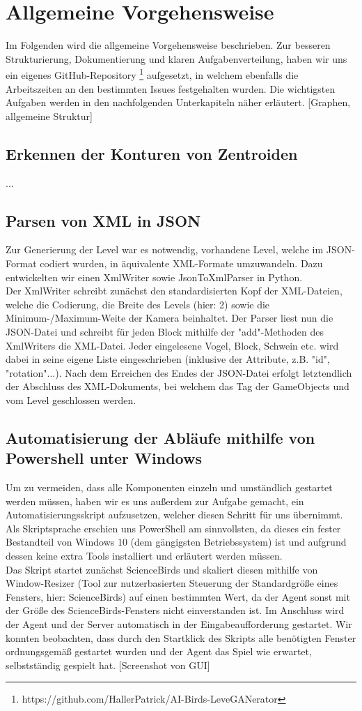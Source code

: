 \section{Allgemeine Vorgehensweise}
Im Folgenden wird die allgemeine Vorgehensweise beschrieben. Zur besseren Strukturierung, Dokumentierung und klaren Aufgabenverteilung, haben wir uns ein eigenes GitHub-Repository \footnote{https://github.com/HallerPatrick/AI-Birds-LeveGANerator} aufgesetzt, in welchem ebenfalls die Arbeitszeiten an den bestimmten Issues festgehalten wurden. Die wichtigsten Aufgaben werden in den nachfolgenden Unterkapiteln näher erläutert. [Graphen, allgemeine Struktur]
\subsection{Erkennen der  Konturen von Zentroiden}
...
\subsection{Parsen von XML in JSON}
Zur Generierung der Level war es notwendig, vorhandene Level, welche im JSON-Format codiert wurden, in äquivalente XML-Formate umzuwandeln. Dazu entwickelten wir einen XmlWriter sowie JsonToXmlParser in Python. \\ Der XmlWriter schreibt zunächst den standardisierten Kopf der XML-Dateien, welche die Codierung, die Breite des Levels (hier: 2) sowie die Minimum-/Maximum-Weite der Kamera beinhaltet. Der Parser liest nun die JSON-Datei und schreibt für jeden Block mithilfe der "add"-Methoden des XmlWriters die XML-Datei. Jeder eingelesene Vogel, Block, Schwein etc. wird dabei in seine eigene Liste eingeschrieben (inklusive der Attribute, z.B. "id", "rotation"...). Nach dem Erreichen des Endes der JSON-Datei erfolgt letztendlich der Abschluss des XML-Dokuments, bei welchem das Tag der GameObjects und vom Level geschlossen werden.
\subsection{Automatisierung der Abläufe mithilfe von Powershell unter Windows}
Um zu vermeiden, dass alle Komponenten einzeln und umständlich gestartet werden müssen, haben wir es uns außerdem zur Aufgabe gemacht, ein Automatisierungsskript aufzusetzen, welcher diesen Schritt für uns übernimmt. Als Skriptsprache erschien uns PowerShell am sinnvollsten, da dieses ein fester Bestandteil von Windows 10 (dem gängigsten Betriebssystem) ist und aufgrund dessen keine extra Tools installiert und erläutert werden müssen. \\Das Skript startet zunächst ScienceBirds und skaliert diesen mithilfe von Window-Resizer (Tool zur nutzerbasierten Steuerung der Standardgröße eines Fensters, hier: ScienceBirds) auf einen bestimmten Wert, da der Agent sonst mit der Größe des ScienceBirds-Fensters nicht einverstanden ist. Im Anschluss wird der Agent und der Server automatisch in der Eingabeaufforderung gestartet. Wir konnten beobachten, dass durch den Startklick des Skripts alle benötigten Fenster ordnungsgemäß gestartet wurden und der Agent das Spiel wie erwartet, selbstständig gespielt hat. [Screenshot von GUI]
